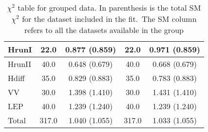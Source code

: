 \documentclass{article}
\begin{document}
\begin{table}[H]
\begin{tabular}{|l|c|c|c|c|}
HrunI & 22.0                         & 0.877                             (0.859) & 22.0                         & 0.971                             (0.859) \\ \hline
HrunII & 40.0                         & 0.648                             (0.679) & 40.0                         & 0.668                             (0.679) \\ \hline
Hdiff & 35.0                         & 0.829                             (0.883) & 35.0                         & 0.783                             (0.883) \\ \hline
VV & 30.0                         & 1.398                             (1.410) & 30.0                         & 1.431                             (1.410) \\ \hline
LEP & 40.0                         & 1.239                             (1.240) & 40.0                         & 1.239                             (1.240) \\ \hline
 \hline Total & 317.0                 & 1.040                     (1.055) & 317.0                 & 1.033                     (1.055) \\ \hline
\end{tabular}
\caption{$\chi^2$ table for grouped data. In parenthesis is the total SM $\chi^2$ for the dataset included in the fit.\
                    The SM column refers to all the datasets available in the group}
\end{table}
\end{document}

